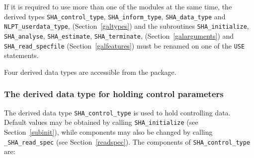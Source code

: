 \documentclass{galahad}
\newcommand{\packagename}{SHA}
\newcommand{\fullpackagename}{\libraryname\_\packagename}
\begin{document}
\noindent
If it is required to use more than one of the modules at the same time, 
the derived types
{\tt \packagename\_control\_type}, 
{\tt \packagename\_inform\_type},
{\tt \packagename\_data\_type}
and
{\tt NLPT\_userdata\_type},
(Section~\ref{galtypes})
and the subroutines
{\tt \packagename\_initialize}, 
{\tt \packagename\_\-analyse},
{\tt \packagename\_\-estimate},
{\tt \packagename\_terminate},
(Section~\ref{galarguments})
and 
{\tt \packagename\_read\_specfile}
(Section~\ref{galfeatures})
must be renamed on one of the {\tt USE} statements.





\galtypes
Four derived data types are accessible from the package.


\subsubsection{The derived data type for holding control 
 parameters}\label{typecontrol}
The derived data type 
{\tt \packagename\_control\_type} 
is used to hold controlling data. Default values may be obtained by calling 
{\tt \packagename\_initialize}
(see Section~\ref{subinit}),
while components may also be changed by calling 
{\tt \fullpackagename\_read\-\_spec}
(see Section~\ref{readspec}). 
The components of 
{\tt \packagename\_control\_type} 
are:
\end{document}

